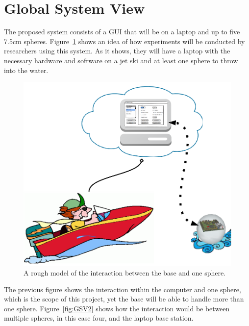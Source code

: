 \section{Global System View}

The proposed system consists of a GUI that will be on a laptop and up to five 7.5cm spheres.  Figure~\ref{fig:GSV1} shows an idea of how experiments will be conducted by researchers using this system.  As it shows, they will have a laptop with the necessary hardware and software on a jet ski and at least one sphere to throw into the water.

\begin{figure}[H]
	\centering
	\includegraphics[scale=0.5]{img/GSV1}
	\caption{A rough model of the interaction between the base and one sphere. \label{fig:GSV1}}
\end{figure}

The previous figure shows the interaction within the computer and one sphere, which is the scope of this project, yet the base will be able to handle more than one sphere.  Figure~\ref{fig:GSV2} shows how the interaction would be between multiple spheres, in this case four, and the laptop base station.

